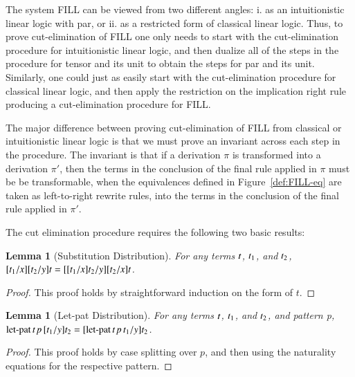 \documentclass[preprint,6pt]{elsarticle}
\newtheorem{lemma}[theorem]{Lemma}
\begin{document}
The system FILL can be viewed from two different angles: i. as an intuitionistic
linear logic with par, or ii. as a restricted form of classical linear
logic.  Thus, to prove cut-elimination of FILL one only needs to start
with the cut-elimination procedure for intuitionistic linear logic,
and then dualize all of the steps in the procedure for tensor and its
unit to obtain the steps for par and its unit.  Similarly, one could
just as easily start with the cut-elimination procedure for classical
linear logic, and then apply the restriction on the implication right
rule producing a cut-elimination procedure for FILL.

The major difference between proving cut-elimination of FILL from
classical or intuitionistic linear logic is that we must prove an
invariant across each step in the procedure.  The invariant is that if
a derivation $\pi$ is transformed into a derivation $\pi'$, then the
terms in the conclusion of the final rule applied in $\pi$ must be be
transformable, when the equivalences defined in
Figure~\ref{def:FILL-eq} are taken as left-to-right rewrite rules,
into the terms in the conclusion of the final rule applied in $\pi'$.

\begin{report}
  The cut elimination procedure requires the following two basic
results:
\begin{lemma}[Substitution Distribution]
  \label{lemma:substitution_distribution}
  For any terms $\mathit{t}$, $\mathit{t_{{\mathrm{1}}}}$, and $\mathit{t_{{\mathrm{2}}}}$,
  $[  \mathit{t_{{\mathrm{1}}}}  /  \mathit{x}  ]  [  \mathit{t_{{\mathrm{2}}}}  /  \mathit{y}  ]  \mathit{t} = [  [  \mathit{t_{{\mathrm{1}}}}  /  \mathit{x}  ]  \mathit{t_{{\mathrm{2}}}}  /  \mathit{y}  ]  [  \mathit{t_{{\mathrm{2}}}}  /  \mathit{x}  ]  \mathit{t}$.
\end{lemma}
\begin{proof}
  This proof holds by straightforward induction on the form of $t$.
\end{proof}

\begin{lemma}[Let-pat Distribution]
  \label{lemma:let-pat_distribution}
  For any terms $\mathit{t}$, $\mathit{t_{{\mathrm{1}}}}$, and $\mathit{t_{{\mathrm{2}}}}$, and pattern p, 
  $ \mathsf{\operatorname{let-pat} }\, \mathit{t} \, \mathit{p} \, [  \mathit{t_{{\mathrm{1}}}}  /  \mathit{y}  ]  \mathit{t_{{\mathrm{2}}}}  = [   \mathsf{\operatorname{let-pat} }\, \mathit{t} \, \mathit{p} \, \mathit{t_{{\mathrm{1}}}}   /  \mathit{y}  ]  \mathit{t_{{\mathrm{2}}}}$.
\end{lemma}
\begin{proof}
  This proof holds by case splitting over $p$, and then using the
  naturality equations for the respective pattern.
\end{proof}
\end{report}
\end{document}
